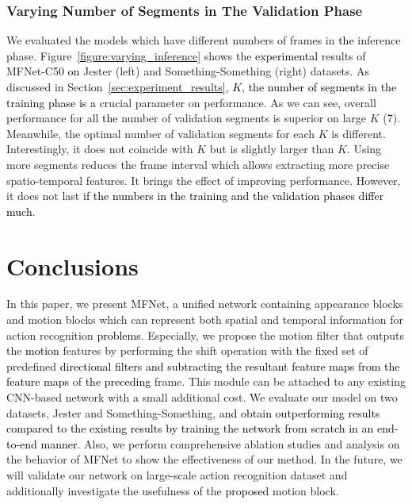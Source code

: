 \documentclass[runningheads]{llncs}
\newcommand{\nj}[1]{\textcolor{black}{#1}}
\begin{document}
\subsubsection{Varying Number of Segments in The Validation Phase}
We evaluated the models which have different numbers of frames in \nj{the} inference phase. Figure~\ref{figure:varying_inference} shows the \nj{experimental} results of MFNet-C50 \nj{on} Jester (left) and Something-Something (right) datasets. As discussed in Section~\ref{sec:experiment_results}, \nj{$K$, the number of segments in the training phase is a} crucial parameter on performance. As we can see, overall performance for all \nj{the} number of validation segments is superior on large $K$ (7). Meanwhile, the optimal number of validation segments for each $K$ is different. Interestingly, it does not coincide with $K$ but is slightly larger than $K$.
Using more segments reduces the frame interval which allows extracting more precise spatio-temporal features. It brings the effect of improving performance. However, it does not last \nj{if the numbers in the training and the validation phases differ much}.

\section{Conclusions}
\label{sec:con}
In this paper, we present MFNet, a unified network containing appearance blocks and motion blocks which can represent both spatial and temporal information for action recognition \nj{problems}. Especially, we propose the motion filter that outputs the \nj{motion} features by performing the shift operation with the fixed set of predefined \nj{directional filters and subtracting the resultant feature maps from the feature maps} of \nj{the preceding} frame. This module can be attached to any existing CNN-based network with \nj{a} small additional cost. We evaluate our model on two datasets, Jester and Something-Something, \nj{and obtain outperforming results compared to the existing results by training the network from scratch in an end-to-end manner}. Also, we perform comprehensive ablation studies and analysis on the behavior of MFNet to show the effectiveness of our method. In the future, we will validate our network on large-scale action recognition dataset and additionally investigate the usefulness of the \nj{proposed} motion block. 



\end{document}
